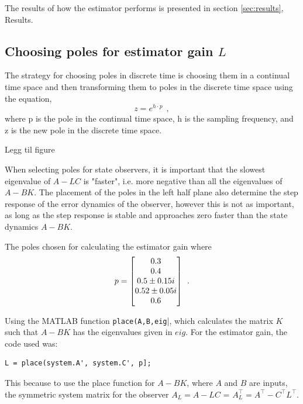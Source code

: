 The results of how the estimator performs is presented in section \ref{sec:results}, Results. 

\subsection{Choosing poles for estimator gain $L$}

The strategy for choosing poles in discrete time is choosing them in a continual time space and then transforming them to poles in the discrete time space using the equation,
\begin{equation}
    z = e^{h \cdot p} \: \: ,
\end{equation}
where p is the pole in the continual time space, h is the sampling frequency, and z is the new pole in the discrete time space. 

Legg til figure

When selecting poles for state observers, it is important that the slowest eigenvalue of $A-LC$ is "faster", i.e. more negative than all the eigenvalues of $A - BK$. The placement of the poles in the left half plane also determine the step response of the error dynamics of the observer, however this is not as important, as long as the step response is stable and approaches zero faster than the state dynamics $A - BK$. 

The poles chosen for calculating the estimator gain where
\begin{equation}
    \begin{split}
        p = \begin{bmatrix}0.3 \\ 0.4 \\ 0.5 \pm 0.15 i \\ 0.52 \pm 0.05 i \\ 0.6\end{bmatrix} \: \: .
    \end{split}
\end{equation}

Using the MATLAB function \verb|place(A,B,eig||, which calculates the matrix $K$ such that $A - BK$ has the eigenvalues given in $eig$. For the estimator gain, the code used was:
\begin{lstlisting}
L = place(system.A', system.C', p];
\end{lstlisting}

This because to use the place function for $A - BK$, where $A$ and $B$ are inputs, the symmetric system matrix for the observer $A_L = A - LC$ = $A_L^\top = A^\top - C^\top L^\top$.

